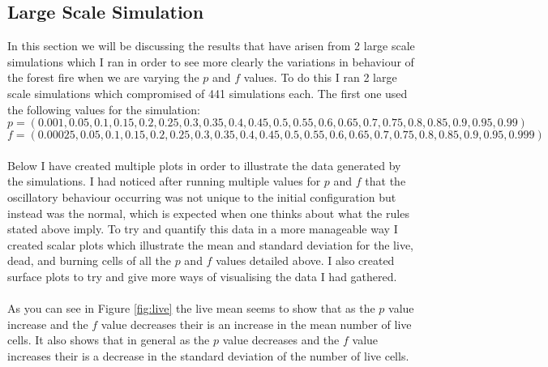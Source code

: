 \documentclass{article}
\begin{document}
\subsection{Large Scale Simulation}
In this section we will be discussing the results that have arisen from 2 large scale simulations which I ran in order to see more clearly the variations in behaviour of the forest fire when we are varying the $p$ and $f$ values. To do this I ran 2 large scale simulations which compromised of 441 simulations each. The first one used the following values for the simulation:
$$
p = (0.001, 0.05, 0.1, 0.15, 0.2, 0.25, 0.3, 0.35, 0.4, 0.45, 0.5, 0.55, 0.6, 0.65, 0.7, 0.75, 0.8, 0.85, 0.9, 0.95, 0.99)
$$
$$
f = (0.00025, 0.05, 0.1, 0.15, 0.2, 0.25, 0.3, 0.35, 0.4, 0.45, 0.5, 0.55, 0.6, 0.65, 0.7, 0.75, 0.8, 0.85, 0.9, 0.95, 0.999)
$$
\\
Below I have created multiple plots in order to illustrate the data generated by the simulations. I had noticed after running multiple values for $p$ and $f$ that the oscillatory behaviour occurring was not unique to the initial configuration but instead was the normal, which is expected when one thinks about what the rules stated above imply. To try and quantify this data in a more manageable way I created scalar plots which illustrate the mean and standard deviation for the live, dead, and burning cells of all the $p$ and $f$ values detailed above. I also created surface plots to try and give more ways of visualising the data I had gathered.\\
\\
As you can see in Figure \ref{fig:live} the live mean seems to show that as the $p$ value increase and the $f$ value decreases their is an increase in the mean number of live cells. It also shows that in general as the $p$ value decreases and the $f$ value increases their is a decrease in the standard deviation of the number of live cells.
\end{document}
